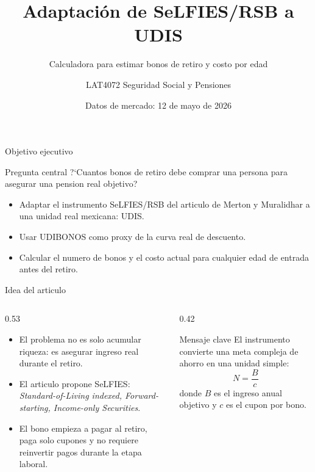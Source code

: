 \documentclass[aspectratio=169,11pt]{beamer}
\title[SeLFIES en UDIS]{Adaptaci\'on de SeLFIES/RSB a UDIS}
\subtitle{Calculadora para estimar bonos de retiro y costo por edad}
\author{LAT4072 Seguridad Social y Pensiones}
\date{Datos de mercado: 12 de mayo de 2026}
\newcommand{\udis}{\textsc{UDIS}}
\begin{document}
\begin{frame}
  \titlepage
\end{frame}

\begin{frame}{Objetivo ejecutivo}
  \begin{block}{Pregunta central}
    \centering
    \large ?`Cuantos bonos de retiro debe comprar una persona para asegurar una pension real objetivo?
  \end{block}
  \vspace{0.4cm}
  \begin{itemize}
    \item Adaptar el instrumento SeLFIES/RSB del articulo de Merton y Muralidhar a una unidad real mexicana: \udis.
    \item Usar UDIBONOS como proxy de la curva real de descuento.
    \item Calcular el numero de bonos y el costo actual para cualquier edad de entrada antes del retiro.
  \end{itemize}
\end{frame}

\begin{frame}{Idea del articulo}
  \begin{columns}[T]
    \begin{column}{0.53\textwidth}
      \begin{itemize}
        \item El problema no es solo acumular riqueza: es asegurar ingreso real durante el retiro.
        \item El articulo propone SeLFIES: \emph{Standard-of-Living indexed, Forward-starting, Income-only Securities}.
        \item El bono empieza a pagar al retiro, paga solo cupones y no requiere reinvertir pagos durante la etapa laboral.
      \end{itemize}
    \end{column}
    \begin{column}{0.42\textwidth}
      \begin{block}{Mensaje clave}
        El instrumento convierte una meta compleja de ahorro en una unidad simple:
        \[
          N = \frac{B}{c}
        \]
        donde $B$ es el ingreso anual objetivo y $c$ es el cupon por bono.
      \end{block}
    \end{column}
  \end{columns}
\end{frame}
\end{document}
